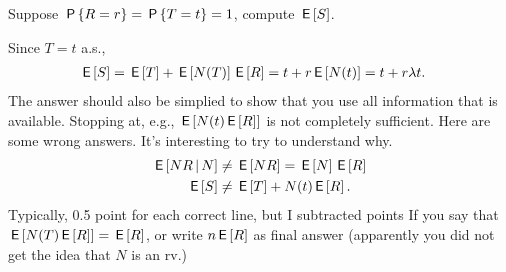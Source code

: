 \begin{exercise}[2]
  Suppose $\P{R=r} = \P{T=t} = 1$, compute $\E S$.
\begin{solution}
    Since $T=t$ a.s.,
    \begin{align*}
      \E S &= \E T  + \E{N(T)}\E R=  t  + r \E{N(t)} = t + r \lambda t.
    \end{align*}
The answer should also be simplied to show that you use all information that is available. Stopping at, e.g., $\E{N (t) \E R}$ is not completely sufficient.
Here are  some wrong answers. It's interesting to try to understand why.
\begin{align}
\E{ N R \given N} &\neq \E{N R} = \E N \E R \\
\E{S} &\neq \E T + N(t) \E R.
\end{align}
Typically, 0.5 point for each correct line, but I subtracted points If you say that $\E{N(T) \E R} = \E R$, or write $n\E R$ as final answer (apparently you did not get the idea that $N$ is an rv.)
\end{solution}

\end{exercise}


